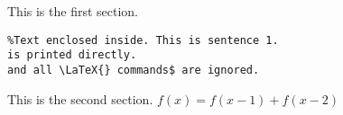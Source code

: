 This is the first section.

\begin{verbatim}
%Text enclosed inside. This is sentence 1.
is printed directly. 
and all \LaTeX{} commands$ are ignored.
\end{verbatim}

This is the second section.
$f(x)=f(x-1)+f(x-2)$
